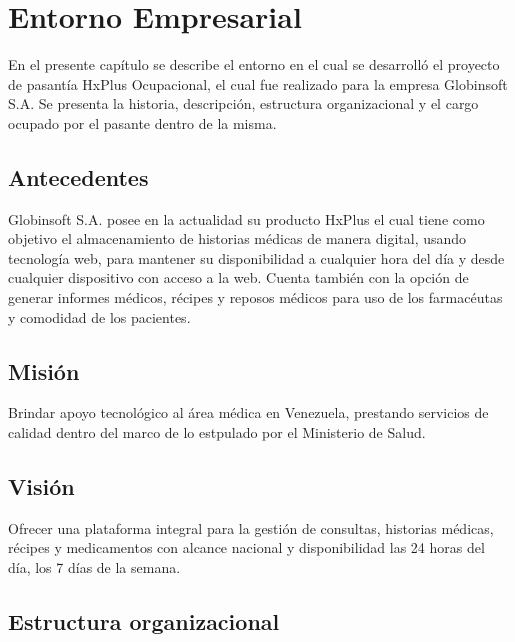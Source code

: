 \chapter{Entorno Empresarial}

En el presente capítulo se describe el entorno en el cual se desarrolló el proyecto de pasantía HxPlus Ocupacional, el cual fue realizado para la empresa Globinsoft S.A. Se presenta la historia, descripción, estructura organizacional y el cargo ocupado por el pasante dentro de la misma.

    \section{Antecedentes}
    Globinsoft S.A. posee en la actualidad su producto HxPlus el cual tiene como objetivo el almacenamiento de historias médicas de manera digital, usando tecnología web, para mantener su disponibilidad a cualquier hora del día y desde cualquier dispositivo con acceso a la web. Cuenta también con la opción de generar informes médicos, récipes y reposos médicos para uso de los farmacéutas y comodidad de los pacientes.
    
    
    \section{Misión}
    
    Brindar apoyo tecnológico al área médica en Venezuela, prestando servicios de calidad dentro del marco de lo estpulado por el Ministerio de Salud.
    
    \section{Visión}
    
    Ofrecer una plataforma integral para la gestión de consultas, historias médicas, récipes y medicamentos con alcance nacional y disponibilidad las 24 horas del día, los 7 días de la semana.
    
    \section{Estructura organizacional}

\pagebreak